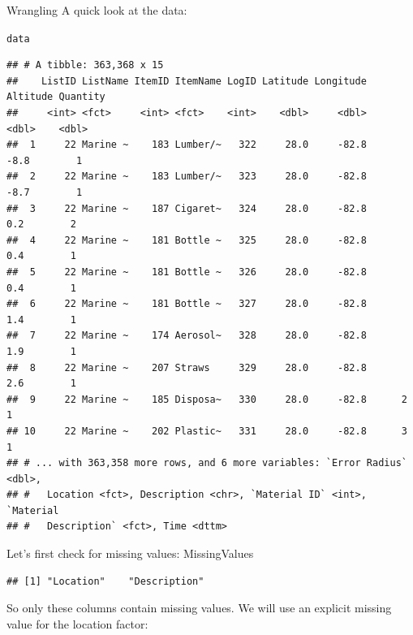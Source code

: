 \documentclass[10pt]{article}\usepackage[]{graphicx}\usepackage[]{color}
\makeatletter
\newcommand{\hlstd}[1]{\textcolor[rgb]{0.345,0.345,0.345}{#1}}%
\newenvironment{kframe}{%
 \def\at@end@of@kframe{}%
 \ifinner\ifhmode%
  \def\at@end@of@kframe{\end{minipage}}%
  \begin{minipage}{\columnwidth}%
 \fi\fi%
 \def\FrameCommand##1{\hskip\@totalleftmargin \hskip-\fboxsep
 \colorbox{shadecolor}{##1}\hskip-\fboxsep
     \hskip-\linewidth \hskip-\@totalleftmargin \hskip\columnwidth}%
 \MakeFramed {\advance\hsize-\width
   \@totalleftmargin\z@ \linewidth\hsize
   \@setminipage}}%
 {\par\unskip\endMakeFramed%
 \at@end@of@kframe}
\newenvironment{knitrout}{}{} %
\makeatother
\begin{document}
\begin{itemize}
Wrangling
A quick look at the data:
\begin{knitrout}
\color{fgcolor}\begin{kframe}
\begin{alltt}
\hlstd{data}
\end{alltt}
\begin{verbatim}
## # A tibble: 363,368 x 15
##    ListID ListName ItemID ItemName LogID Latitude Longitude Altitude Quantity
##     <int> <fct>     <int> <fct>    <int>    <dbl>     <dbl>    <dbl>    <dbl>
##  1     22 Marine ~    183 Lumber/~   322     28.0     -82.8     -8.8        1
##  2     22 Marine ~    183 Lumber/~   323     28.0     -82.8     -8.7        1
##  3     22 Marine ~    187 Cigaret~   324     28.0     -82.8      0.2        2
##  4     22 Marine ~    181 Bottle ~   325     28.0     -82.8      0.4        1
##  5     22 Marine ~    181 Bottle ~   326     28.0     -82.8      0.4        1
##  6     22 Marine ~    181 Bottle ~   327     28.0     -82.8      1.4        1
##  7     22 Marine ~    174 Aerosol~   328     28.0     -82.8      1.9        1
##  8     22 Marine ~    207 Straws     329     28.0     -82.8      2.6        1
##  9     22 Marine ~    185 Disposa~   330     28.0     -82.8      2          1
## 10     22 Marine ~    202 Plastic~   331     28.0     -82.8      3          1
## # ... with 363,358 more rows, and 6 more variables: `Error Radius` <dbl>,
## #   Location <fct>, Description <chr>, `Material ID` <int>, `Material
## #   Description` <fct>, Time <dttm>
\end{verbatim}
\end{kframe}
\end{knitrout}
Let's first check for missing values:
MissingValues
\begin{knitrout}
\color{fgcolor}\begin{kframe}
\begin{verbatim}
## [1] "Location"    "Description"
\end{verbatim}
\end{kframe}
\end{knitrout}
So only these columns contain missing values. We will use an explicit missing value for the location factor:


\end{itemize}
\end{document}
